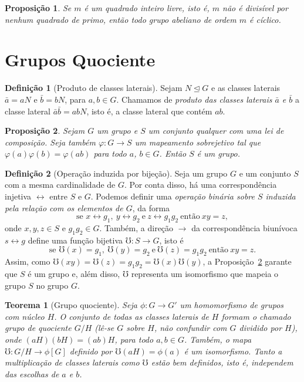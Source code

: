 \documentclass[a4paper,12pt]{report}
\theoremstyle{plain}
\newtheorem{teorema}{Teorema}[section]
\newtheorem{proposicao}{Proposição}[section]
\theoremstyle{definition}
\newtheorem{definicao}{Definição}[section]
\begin{document}
\begin{proposicao}
	Se $m$ é um \emph{quadrado inteiro livre}, isto é, $m$ não é divisível por nenhum quadrado de primo, então todo grupo abeliano de ordem $m$ é cíclico.
\end{proposicao}

\section{Grupos Quociente}

\begin{definicao}[Produto de classes laterais] Sejam $N\trianglelefteq G$ e as classes laterais \(\bar a = aN\) e \(\bar b = bN\), para $a,b \in G$. Chamamos de \emph{produto das classes laterais \(\bar a\) e \(\bar b\)} a classe lateral \(\bar a \bar b = abN\), isto é, a classe lateral que contém \(ab\).	
\end{definicao}


\begin{proposicao}\label{prop:grupoInduzidoPorOutro}
	Sejam \(G\) um grupo e \(S\) um conjunto qualquer
	com uma lei de composição. Seja também \(\varphi:G\longrightarrow S\) um
	mapeamento sobrejetivo tal que \(\varphi(a)\varphi(b) = \varphi(ab)\)
	para todo \(a\), \(b\in G\). Então \(S\) é um grupo.	
\end{proposicao}

\begin{definicao}[Operação induzida por bijeção]
	Seja um grupo $G$ e um conjunto $S$ com a mesma cardinalidade de $G$. Por conta disso, há uma correspondência injetiva $\leftrightarrow$ entre $S$ e $G$. Podemos definir uma \emph{operação binária sobre $S$ induzida pela relação com os elementos de $G$}, da forma
	$$\text{se }x\leftrightarrow g_1,\ y\leftrightarrow g_2\ \text{e}\ z\leftrightarrow g_1g_2\ \text{então} \ xy = z,$$ onde $x,y,z\in S$ e $g_1g_2\in G$. Também, a direção $\rightarrow$ da correspondência biunívoca $s\leftrightarrow g$ define uma função bijetiva $\mho: S \longrightarrow G$, isto é
	$$\text{se }\mho(x) = g_1,\ \mho(y) = g_2\ \text{e}\ \mho(z)= g_1g_2\ \text{então} \ xy = z.$$
	Assim, como $\mho(xy) =\mho(z) = g_1g_2 = \mho(x)\mho(y)$, a Proposição~\ref{prop:grupoInduzidoPorOutro} garante que $S$ é um grupo e, além disso, $\mho$ representa um isomorfismo que mapeia o grupo $S$ no grupo $G$.
\end{definicao}

\begin{teorema}[Grupo quociente]
	Seja $\phi: G \longrightarrow G'$ um homomorfismo de grupos com núcleo $H$. O conjunto de todas as classes laterais de $H$ formam o chamado \emph{grupo de quociente} $G/H$ (lê-se $G$ sobre $H$, não confundir com $G$ dividido por $H$), onde $(aH)(bH) = (ab)H$, para todo $a,b \in G$. Também, o mapa $\mho: G/H \longrightarrow \phi[G]$ definido por $\mho(aH) = \phi(a)$ é um isomorfismo. Tanto a multiplicação de classes laterais como $\mho$ estão bem definidos, isto é, independem das escolhas de $a$ e $b$.
\end{teorema}
\end{document}
